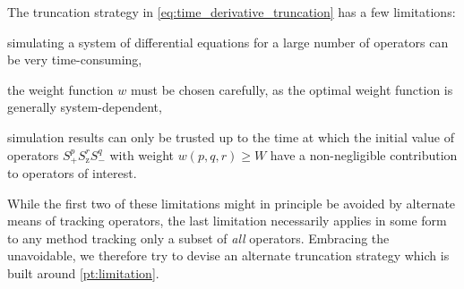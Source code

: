 \documentclass[aps,notitlepage,nofootinbib,11pt]{revtex4-1}
\newcommand{\p}[1]{\left(#1\right)} %
\newcommand{\z}{\text{z}}
\newcommand{\1}{\mathds{1}}
\begin{document}
The truncation strategy in \eqref{eq:time_derivative_truncation} has a
few limitations:
\begin{enumerate*}[label=(\roman*)]
\item simulating a system of differential equations for a large number
  of operators can be very time-consuming,
\item the weight function $w$ must be chosen carefully, as the optimal
  weight function is generally system-dependent,
\item simulation results can only be trusted up to the time at which
  the initial value of operators $S_+^p S_\z^r S_-^q$ with weight
  $w\p{p,q,r}\ge W$ have a non-negligible contribution to operators of
  interest.\label{pt:limitation}
\end{enumerate*}
While the first two of these limitations might in principle be avoided
by alternate means of tracking operators, the last limitation
necessarily applies in some form to any method tracking only a subset
of {\it all} operators.  Embracing the unavoidable, we therefore try
to devise an alternate truncation strategy which is built around
\ref{pt:limitation}.
\end{document}
